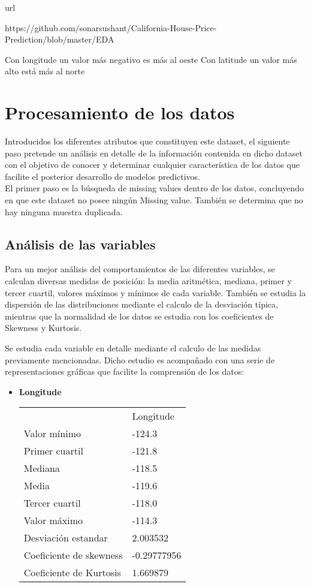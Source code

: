 url{https://github.com/sonarsushant/California-House-Price-Prediction/blob/master/EDA%

Con longitude un valor más negativo es más al oeste
Con latitude un valor más alto está más al norte





\section{Procesamiento de los datos}
Introducidos los diferentes atributos que constituyen este dataset, el siguiente paso pretende un análisis en detalle de la información contenida en dicho dataset con el objetivo de conocer y determinar cualquier característica de los datos que facilite el posterior desarrollo de modelos predictivos. \\

El primer paso es la búsqueda de missing values dentro de los datos, concluyendo en que este dataset no posee ningún Missing value.
También se determina que no hay ninguna muestra duplicada.


\subsection{Análisis de las variables}
Para un mejor análisis del comportamientos de las diferentes variables, se calculan diversas medidas de posición: la media aritmética, mediana, primer y tercer cuartil, valores máximos y mínimos de cada variable. También se estudia la dispersión de las distribuciones mediante el calculo  de la desviación típica, mientras que la normalidad de los datos se estudia con los coeficientes de Skewness y Kurtosis.



Se estudia cada variable en detalle mediante el calculo de las medidas previamente mencionadas. Dicho estudio es acompañado con una serie de representaciones gráficas que facilite la comprensión de los datos:

\begin{itemize}
	\item \textbf{Longitude}
	\begin{table}[]
		\begin{tabular}{ll}
			& Longitude   \\
			Valor mínimo            & -124.3      \\
			Primer cuartil          & -121.8      \\
			Mediana                 & -118.5      \\
			Media                   & -119.6      \\
			Tercer cuartil          & -118.0      \\
			Valor máximo            & -114.3      \\ \hline
			Desviación estandar     & 2.003532    \\ \hline
			Coeficiente de skewness & -0.29777956 \\
			Coeficiente de Kurtosis & 1.669879   
		\end{tabular}
	\end{table}


\end{itemize}}
